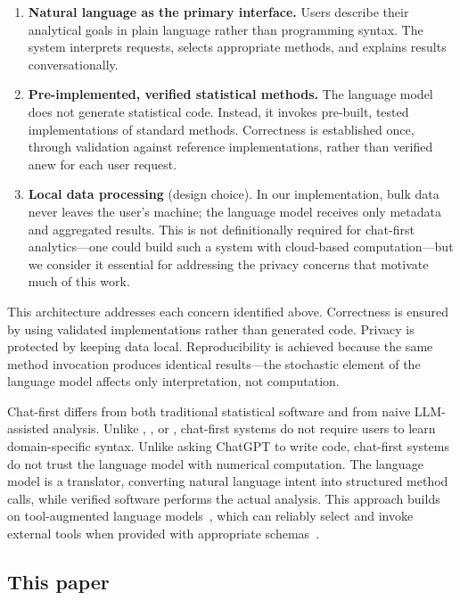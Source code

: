 \begin{enumerate}
  \item \textbf{Natural language as the primary interface.} Users describe
    their analytical goals in plain language rather than programming syntax.
    The system interprets requests, selects appropriate methods, and explains
    results conversationally.
  \item \textbf{Pre-implemented, verified statistical methods.} The language
    model does not generate statistical code. Instead, it invokes pre-built,
    tested implementations of standard methods. Correctness is established
    once, through validation against reference implementations, rather than
    verified anew for each user request.
  \item \textbf{Local data processing} (design choice). In our implementation,
    bulk data never leaves the user's machine; the language model receives
    only metadata and aggregated results. This is not definitionally required
    for chat-first analytics---one could build such a system with cloud-based
    computation---but we consider it essential for addressing the privacy
    concerns that motivate much of this work.
\end{enumerate}

This architecture addresses each concern identified above. Correctness is
ensured by using validated implementations rather than generated code.
Privacy is protected by keeping data local. Reproducibility is achieved
because the same method invocation produces identical results---the
stochastic element of the language model affects only interpretation, not
computation.

Chat-first differs from both traditional statistical software
and from naive LLM-assisted analysis. Unlike , ,
or , chat-first systems do not require users to learn
domain-specific syntax. Unlike asking ChatGPT to write code, chat-first
systems do not trust the language model with numerical computation.
The language model is a translator, converting natural language
intent into structured method calls, while verified software performs
the actual analysis. This approach builds on tool-augmented
language models~\citep{Schick+etal:2023, Qin+etal:2024, Liu+etal:2025:ToolACE},
which can reliably select and invoke external tools when provided with
appropriate schemas~\citep{Qu+etal:2025}.

\subsection{This paper}

